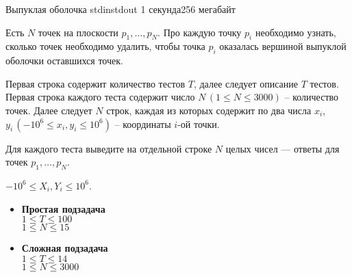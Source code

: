
\begin{problem}{Выпуклая оболочка}
{stdin}{stdout}
{1 секунда}{256 мегабайт}{}

Есть $N$ точек на плоскости $p_1, \dots, p_N$.
Про каждую точку $p_i$ необходимо узнать, сколько точек необходимо удалить, 
чтобы точка $p_i$ оказалась вершиной выпуклой оболочки оставшихся точек.

\InputFile

Первая строка содержит количество тестов $T$, далее следует описание $T$ тестов.
Первая строка каждого теста содержит число $N \,(1 \le N \le 3000)$ -- количество точек.
Далее следует $N$ строк, каждая из которых содержит по два числа $x_i$, $y_i \,(-10^6 \le x_i, y_i \le 10^6)$ -- 
координаты $i$-ой точки.

\OutputFile

Для каждого теста выведите на отдельной строке $N$ целых чисел ---
ответы для точек $p_1, \dots, p_N$.

\Scoring

$-10^6 \le X_i, Y_i \le 10^6$.

\begin{itemize}
  \item {\bf Простая подзадача} \\
    $1 \le T \le 100$\\
    $1 \le N \le 15$
  \item {\bf Сложная подзадача} \\
    $1 \le T \le 14$\\
    $1 \le N \le 3000$
\end{itemize}

\Examples

\begin{example}
%
\end{example}

\end{problem}

